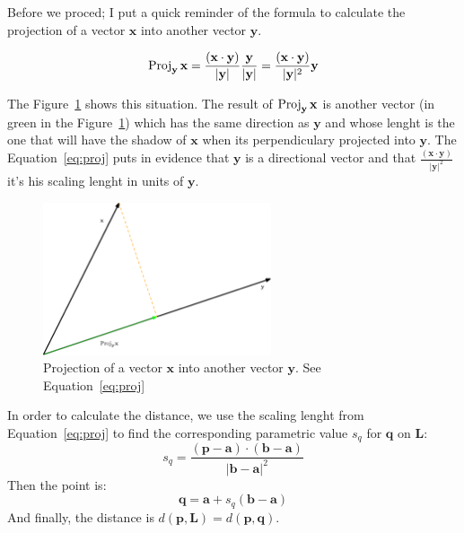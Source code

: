 Before we proced; I put a quick reminder of the formula to calculate the projection of a vector $\mathbf{x}$ into another vector $\mathbf{y}$. 

\begin{equation}
\operatorname{Proj}_{\mathbf{y}}\mathbf{x} = \dfrac{(\mathbf{x} \cdot \mathbf{y})}{|\mathbf{y}|} \dfrac{\mathbf{y}}{|\mathbf{y}|} = \dfrac{(\mathbf{x} \cdot \mathbf{y})}{|\mathbf{y}|^2}\mathbf{y}
\label{eq:proj}
\end{equation}

The Figure~\ref{fig:projection} shows this situation.
The result of $\operatorname{Proj}_{\mathbf{y}}\mathbf{x}$ is another vector (in green in the Figure~\ref{fig:projection}) which has the same direction as $\mathbf{y}$ and whose lenght is the one that will have the shadow of $\mathbf{x}$ when its perpendiculary projected into $\mathbf{y}$.
The Equation~\ref{eq:proj} puts in evidence that $\mathbf{y}$ is a directional vector and that $\frac{(\mathbf{x} \cdot \mathbf{y})}{|\mathbf{y}|^2}$ it's his scaling lenght in units of $\mathbf{y}$.

\begin{figure}[htb]
  \centering
  \includegraphics[width=0.60\textwidth]{img/projection}
  \caption{Projection of a vector $\mathbf{x}$ into another vector $\mathbf{y}$. See Equation~\ref{eq:proj}}
  \label{fig:projection}
\end{figure}

In order to calculate the distance, we use the scaling lenght from Equation~\ref{eq:proj} to find the corresponding parametric value $s_q$ for $\mathbf{q}$ on $\mathbf{L}$: 
\begin{equation}
s_q = \dfrac{(\mathbf{p} - \mathbf{a}) \cdot (\mathbf{b} - \mathbf{a})}{|\mathbf{b} - \mathbf{a}|^2}
\label{eq:scalarq}
\end{equation}
Then the point is:
\begin{equation}
\mathbf{q} = \mathbf{a} + s_q (\mathbf{b} -\mathbf{a})
\label{eq:pointq}
\end{equation}
And finally, the distance is $d(\mathbf{p}, \mathbf{L}) = d(\mathbf{p}, \mathbf{q})$.

